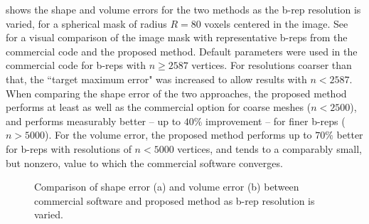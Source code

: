  shows the shape and volume errors for the two methods as the b-rep resolution is varied, for a spherical mask of radius $R = 80$ voxels centered in the image. See~ for a visual comparison of the image mask with representative b-reps from the commercial code and the proposed method. Default parameters were used in the commercial code for b-reps with $n \ge 2587$ vertices. For resolutions coarser than that, the ``target maximum error" was increased to allow results with $n < 2587$. When comparing the shape error of the two approaches, the proposed method performs at least as well as the commercial option for coarse meshes ($n < 2500$), and performs measurably better -- up to $40\%$ improvement -- for finer b-reps ($n > 5000$). For the volume error, the proposed method performs up to $70\%$ better for b-reps with resolutions of $n < 5000$ vertices, and tends to a comparably small, but nonzero, value to which the commercial software converges.
\begin{figure}[h!]
\centering
{}
%	
\caption{Comparison of shape error (a) and volume error (b) between commercial software and proposed method as b-rep resolution is varied.}
\label{fig:graph1}
\end{figure}
